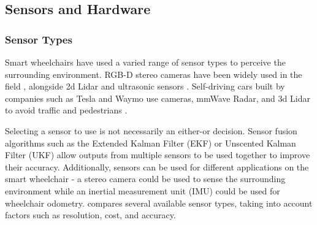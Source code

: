 

\subsection{Sensors and Hardware}

\subsubsection{Sensor Types}
Smart wheelchairs have used a varied range of sensor types to perceive the surrounding environment.
RGB-D stereo cameras have been widely used in the field \cite{wangS2P2SelfSupervisedGoalDirected2021}\cite{wangSelfSupervisedDrivableArea2019}\cite{jainAutomatedPerceptionSafe2014},
alongside 2d Lidar \cite{scudellariSelfdrivingWheelchairsDebut2017} and ultrasonic sensors \cite{levineNavChairAssistiveWheelchair1999}.
Self-driving cars built by companies such as Tesla and Waymo
use cameras, mmWave Radar, and 3d Lidar to avoid traffic and pedestrians \cite{karpathyTeslaAIDay2021}.

Selecting a sensor to use is not necessarily an either-or decision. Sensor fusion algorithms such as
the Extended Kalman Filter (EKF) or Unscented Kalman Filter (UKF) \cite{wanUnscentedKalmanFilter2000} allow
outputs from multiple sensors to be used together to improve their accuracy. Additionally, sensors can
be used for different applications on the smart wheelchair - a stereo camera could be used to sense the surrounding environment
while an inertial measurement unit (IMU) could be used for wheelchair odometry.
 compares several available sensor types,
taking into account factors such as resolution, cost, and accuracy.

